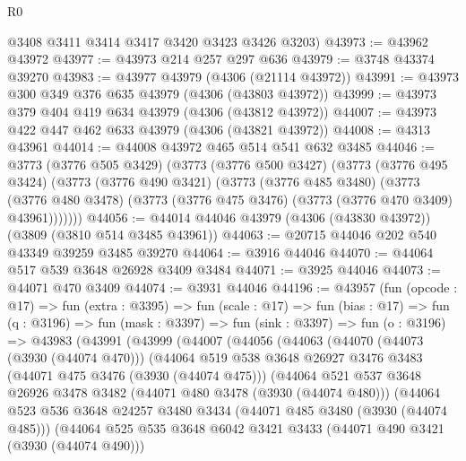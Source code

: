 \begin{lexlean}{R0}
\begin{coremodule}
      @3408
      @3411
      @3414
      @3417
      @3420
      @3423
      @3426
      @3203)
@43973 := @43962 @43972
@43977 := @43973 @214 @257 @297 @636
@43979 := @3748 @43374 @39270
@43983 := @43977 @43979 (@4306 (@21114 @43972))
@43991 := @43973 @300 @349 @376 @635 @43979 (@4306 (@43803 @43972))
@43999 := @43973 @379 @404 @419 @634 @43979 (@4306 (@43812 @43972))
@44007 := @43973 @422 @447 @462 @633 @43979 (@4306 (@43821 @43972))
@44008 := @4313 @43961
@44014 := @44008 @43972 @465 @514 @541 @632 @3485
@44046 := @3773
    (@3776 @505 @3429)
    (@3773
      (@3776 @500 @3427)
      (@3773
        (@3776 @495 @3424)
        (@3773
          (@3776 @490 @3421)
          (@3773
            (@3776 @485 @3480)
            (@3773
              (@3776 @480 @3478)
              (@3773 (@3776 @475 @3476) (@3773 (@3776 @470 @3409) @43961)))))))
@44056 := @44014 @44046 @43979 (@4306 (@43830 @43972)) (@3809 (@3810 @514 @3485 @43961))
@44063 := @20715 @44046 @202 @540 @43349 @39259 @3485 @39270
@44064 := @3916 @44046
@44070 := @44064 @517 @539 @3648 @26928 @3409 @3484
@44071 := @3925 @44046
@44073 := @44071 @470 @3409
@44074 := @3931 @44046
@44196 := @43957
    (fun (opcode : @17) =>
    fun (extra : @3395) =>
    fun (scale : @17) =>
    fun (bias : @17) =>
    fun (q : @3196) =>
    fun (mask : @3397) =>
    fun (sink : @3397) =>
    fun (o : @3196) =>
    @43983
      (@43991
        (@43999
          (@44007
            (@44056
              (@44063
                (@44070
                  (@44073 (@3930 (@44074 @470)))
                  (@44064
                    @519
                    @538
                    @3648
                    @26927
                    @3476
                    @3483
                    (@44071 @475 @3476 (@3930 (@44074 @475)))
                    (@44064
                      @521
                      @537
                      @3648
                      @26926
                      @3478
                      @3482
                      (@44071 @480 @3478 (@3930 (@44074 @480)))
                      (@44064
                        @523
                        @536
                        @3648
                        @24257
                        @3480
                        @3434
                        (@44071 @485 @3480 (@3930 (@44074 @485)))
                        (@44064
                          @525
                          @535
                          @3648
                          @6042
                          @3421
                          @3433
                          (@44071 @490 @3421 (@3930 (@44074 @490)))

\end{coremodule}
\end{lexlean}

